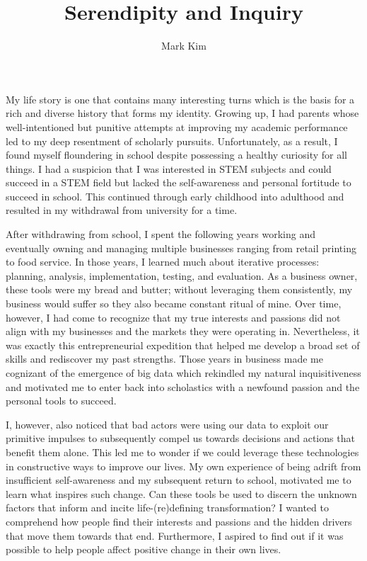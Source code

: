 \documentclass[12pt]{article}
\title{Serendipity and Inquiry}
\author{Mark Kim}
\begin{document}
\maketitle

My life story is one that contains many interesting turns which is the basis for
a rich and diverse history that forms my identity.  Growing up, I had parents
whose well-intentioned but punitive attempts at improving my academic
performance led to my deep resentment of scholarly pursuits.  Unfortunately, as
a result, I found myself floundering in school despite possessing a healthy
curiosity for all things.  I had a suspicion that I was interested in STEM
subjects and could succeed in a STEM field but lacked the self-awareness and
personal fortitude to succeed in school.  This continued through early childhood
into adulthood and resulted in my withdrawal from university for a time.

After withdrawing from school, I spent the following years working and
eventually owning and managing multiple businesses ranging from retail printing
to food service.  In those years, I learned much about iterative processes:
planning, analysis, implementation, testing, and evaluation.  As a business
owner, these tools were my bread and butter; without leveraging them
consistently, my business would suffer so they also became constant ritual of mine.
Over time, however, I had come to recognize that my true interests and
passions did not align with my businesses and the markets they were operating
in. Nevertheless, it was exactly this entrepreneurial expedition that helped me
develop a broad set of skills and rediscover my past strengths.  Those years in
business made me cognizant of the emergence of big data which rekindled my natural
inquisitiveness and motivated me to enter back into scholastics with a newfound
passion and the personal tools to succeed.

I, however, also noticed that bad actors were using our data to exploit our primitive
impulses to subsequently compel us towards decisions and actions that benefit
them alone.  This led me to wonder if we could leverage these technologies in
constructive ways to improve our lives.  My own experience of being adrift from
insufficient self-awareness and my subsequent return to school, motivated me to
learn what inspires such change.  Can these tools be used to discern the unknown
factors that inform and incite life-(re)defining transformation?  I wanted to
comprehend how people find their interests and passions and the hidden drivers
that move them towards that end.  Furthermore, I aspired to find out if it was
possible to help people affect positive change in their own lives.
\end{document}
